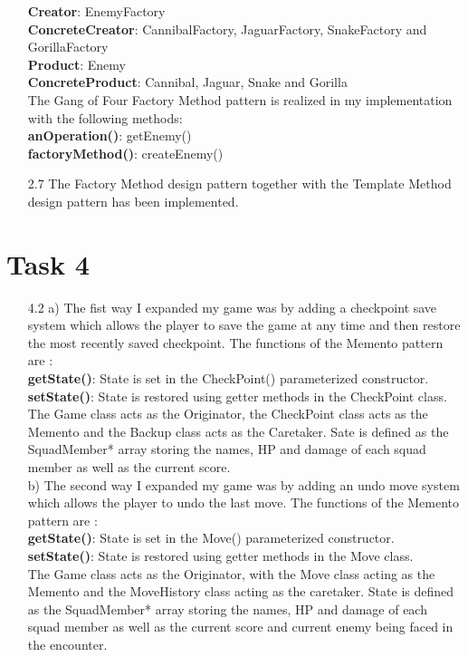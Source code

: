 \documentclass{article}
\begin{document}
\begin{itemize}
        \textbf{Creator}: EnemyFactory\\
        \textbf{ConcreteCreator}: CannibalFactory, JaguarFactory, SnakeFactory and GorillaFactory\\
        \textbf{Product}: Enemy\\
        \textbf{ConcreteProduct}: Cannibal, Jaguar, Snake and Gorilla\\
        The Gang of Four Factory Method pattern is realized in my implementation with the following methods:\\
        \textbf{anOperation()}: getEnemy()\\
        \textbf{factoryMethod()}: createEnemy()\\
    \item[2.7] The Factory Method design pattern together with the Template Method design pattern has been implemented.  
\end{itemize}

\section*{Task 4}
\begin{itemize}
    \item[4.2] a) The fist way I expanded my game was by adding a checkpoint save system 
                    which allows the player to save the game at any time and then restore
                    the most recently saved checkpoint. The functions of the Memento pattern 
                    are :\\
                  \textbf{getState()}: State is set in the CheckPoint() parameterized constructor.\\
                  \textbf{setState()}: State is restored using  getter methods in the CheckPoint class.\\
                  The Game class acts as the Originator, the CheckPoint class acts as the Memento 
                  and the Backup class acts as the Caretaker. Sate is defined as the SquadMember* array
                  storing the names, HP and damage of each squad member as well as the current score.\\
                    
                b) The second way I expanded my game was by adding an undo move system 
                which allows the player to undo the last move. The functions of the Memento pattern
                are :\\
                \textbf{getState()}: State is set in the Move() parameterized constructor.\\
                \textbf{setState()}: State is restored using getter methods in the Move class.\\
                The Game class acts as the Originator, with the Move class acting as the 
                Memento and the MoveHistory class acting as the caretaker. State is defined as the 
                SquadMember* array storing the names, HP and damage of each squad member as well as the 
                current score and current enemy being faced in the encounter.\\

\end{itemize}
\end{document}
